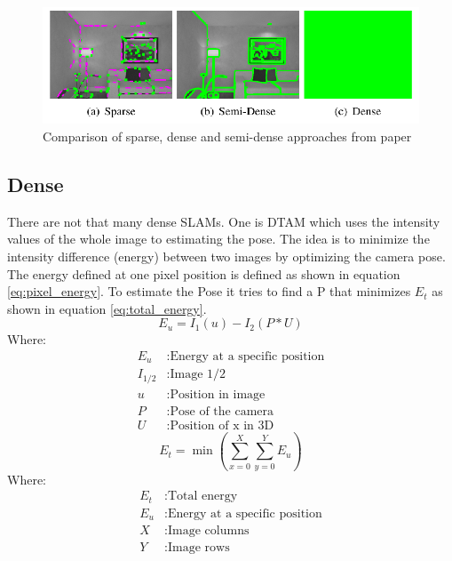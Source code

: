 \documentclass[11pt,a4paper,titlepage,oneside]{report}
\begin{document}
\begin{figure}[H]
  \begin{center}
		\includegraphics[width=1.0\textwidth]{img/sparse_dense.png}
  \end{center}
	\caption{Comparison of sparse, dense and semi-dense approaches from paper \cite{svo}}\label{fig:sparse_dense}
\end{figure}

\subsection{Dense}

There are not that many dense SLAMs. One is DTAM \cite{dtam} which uses the intensity values of the whole image to estimating the pose. The idea is to minimize the intensity difference (energy) between two images by optimizing the camera pose. The energy defined at one pixel position is defined as shown in equation \ref{eq:pixel_energy}. To estimate the Pose it tries to find a P that minimizes $E_{t}$ as shown in equation \ref{eq:total_energy}.
\begin{equation}\label{eq:pixel_energy}
  E_{u}=I_1(u)-I_2(P*U)
\end{equation}
Where:
\begin{align*}
  E_{u}		&: \text{Energy at a specific position}\\
  I_{1/2}	&: \text{Image 1/2}\\
  u		&: \text{Position in image} \\
  P		&: \text{Pose of the camera} \\
  U		&: \text{Position of x in 3D}
\end{align*}
\begin{equation}\label{eq:total_energy}
  E_{t}=\min(\sum_{x=0}^X\sum_{y=0}^YE_u)
\end{equation}
Where:
\begin{align*}
  E_{t}		&: \text{Total energy}\\
  E_{u}		&: \text{Energy at a specific position}\\
	X				&: \text{Image columns}\\
	Y				&: \text{Image rows}\\
\end{align*}
\end{document}
